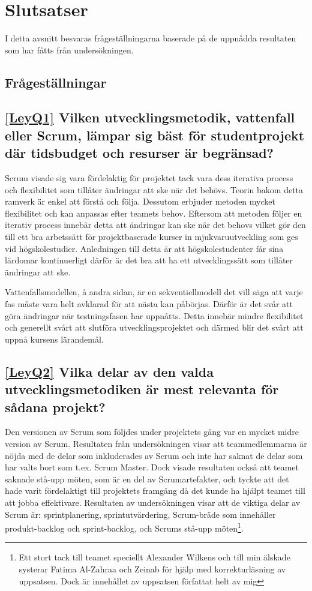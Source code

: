 
\section{Slutsatser}
\label{sec:Lieth_Wahid-conclusion}
I detta avsnitt besvaras frågeställningarna baserade på de uppnådda resultaten som har fåtts från undersökningen.
\subsection{Frågeställningar}

\subsection*{\ref{LeyQ1} Vilken utvecklingsmetodik, vattenfall eller Scrum, lämpar sig bäst för studentprojekt där tidsbudget och resurser är begränsad?}
Scrum visade sig vara fördelaktig för projektet tack vara dess iterativa process och flexibilitet som tillåter ändringar att ske när det behövs. Teorin bakom detta ramverk är enkel att förstå och följa. Dessutom erbjuder metoden mycket flexibilitet och kan anpassas efter teamets behov. Eftersom att metoden följer en iterativ process innebär detta att ändringar kan ske när det behovs vilket gör den till ett bra arbetssätt för projektbaserade kurser in mjukvaruutveckling som ges vid högskolestudier. Anledningen till detta är att högskolestudenter får sina lärdomar kontinuerligt därför är det bra att ha ett utvecklingssätt som tillåter ändringar att ske.
	
Vattenfallsmodellen, å andra sidan, är en sekventiellmodell det vill säga att varje fas måste vara helt avklarad för att nästa kan påbörjas. Därför är det svår att göra ändringar när testningsfasen har uppnåtts. Detta innebär mindre flexibilitet och generellt svårt att slutföra utvecklingsprojektet och därmed blir det svårt att uppnå kursens lärandemål.
		
\subsection*{\ref{LeyQ2} Vilka delar av den valda utvecklingsmetodiken är mest relevanta för sådana projekt? }
Den versionen av Scrum som följdes under projektets gång var en mycket midre version av Scrum. Resultaten från undersökningen visar att teammedlemmarna är nöjda med de delar som inkluderades av Scrum och inte har saknat de delar som har valts bort som t.ex. Scrum Master. Dock visade resultaten också att teamet saknade stå-upp möten, som är en del av Scrumartefakter, och tyckte att det hade varit fördelaktigt till projektets framgång då det kunde ha hjälpt teamet till att jobba effektivare. Resultaten av undersökningen visar att de viktiga delar av Scrum är: sprintplanering, sprintutvärdering, Scrum-bräde som innehåller produkt-backlog och sprint-backlog, och Scrums stå-upp möten\footnote{Ett stort tack till teamet speciellt Alexander Wilkens och till min älskade systerar Fatima Al-Zahraa och Zeinab för hjälp med korrekturläsning av uppsatsen. Dock är innehållet av uppsatsen författat helt av mig}.